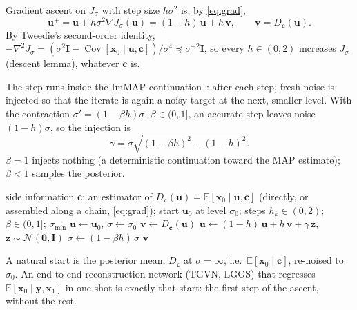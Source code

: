 \documentclass[11pt]{article}
\theoremstyle{remark}
\newcommand{\x}{\bm{x}}
\newcommand{\y}{\bm{y}}
\newcommand{\uu}{\bm{u}}
\newcommand{\vv}{\bm{v}}
\newcommand{\zz}{\bm{z}}
\newcommand{\cc}{\bm{c}}
\newcommand{\E}{\mathbb{E}}
\newcommand{\N}{\mathcal{N}}
\newcommand{\Id}{\bm{I}}
\newcommand{\grad}{\nabla}
\begin{document}
Gradient ascent on $J_\sigma$ with step size $h\sigma^2$ is, by \eqref{eq:grad},
\begin{equation}
  \boxed{\;\uu^+ = \uu + h\sigma^2\grad J_\sigma(\uu) = (1-h)\,\uu + h\,\vv,
  \qquad \vv = D_{\cc}(\uu).\;}
  \label{eq:step}
\end{equation}
By Tweedie's second-order identity, $-\grad^2 J_\sigma = (\sigma^2\Id -
\operatorname{Cov}[\x_0\mid\uu,\cc])/\sigma^4\preceq\sigma^{-2}\Id$, so every
$h\in(0,2)$ increases $J_\sigma$ (descent lemma), whatever $\cc$ is.

The step runs inside the ImMAP continuation~\cite{ks2021}: after each step, fresh noise is
injected so that the iterate is again a noisy target at the next, smaller level. With the
contraction $\sigma' = (1-\beta h)\sigma$, $\beta\in(0,1]$, an accurate step leaves noise
$(1-h)\sigma$, so the injection is
\begin{equation}
  \gamma = \sigma\sqrt{(1-\beta h)^2 - (1-h)^2}.
  \label{eq:inject}
\end{equation}
$\beta = 1$ injects nothing (a deterministic continuation toward the MAP estimate); $\beta<1$
samples the posterior.

\begin{algorithm}[H]
\caption{Guided ImMAP ascent for $\max_{\x_0}\log p(\x_0\mid\cc)$}
\label{alg:generic}
\begin{algorithmic}[1]
\Require side information $\cc$; an estimator of $D_{\cc}(\uu) = \E[\x_0\mid\uu,\cc]$ (directly,
         or assembled along a chain, \eqref{eq:grad}); start $\uu_0$ at level $\sigma_0$;
         steps $h_k\in(0,2)$; $\beta\in(0,1]$; $\sigma_{\min}$
\State $\uu\gets\uu_0$, $\sigma\gets\sigma_0$
\While{$\sigma>\sigma_{\min}$}
  \State $\vv \gets D_{\cc}(\uu)$
         \Comment{$=\uu + \sigma^2\grad J_\sigma(\uu)$}
  \State $\uu \gets (1-h)\,\uu + h\,\vv + \gamma\,\zz$, \ $\zz\sim\N(\bm0,\Id)$
  \State $\sigma \gets (1-\beta h)\,\sigma$
\EndWhile
\State \Return $\vv$
\end{algorithmic}
\end{algorithm}

\noindent A natural start is the posterior mean, $D_{\cc}$ at $\sigma = \infty$, i.e.\
$\E[\x_0\mid\cc]$, re-noised to $\sigma_0$. An end-to-end reconstruction network (TGVN, LGGS)
that regresses $\E[\x_0\mid\y,\x_1]$ in one shot is exactly that start: the first step of the
ascent, without the rest.

\end{document}
